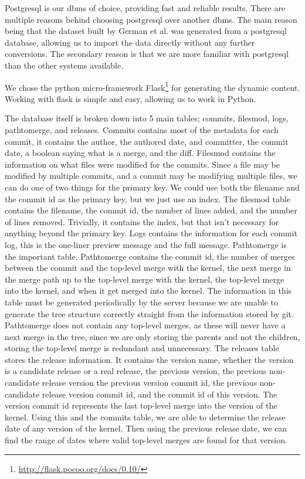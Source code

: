 \documentclass[conference, draftclsnofoot]{IEEEtran}
\begin{document}
Postgresql is our dbms of choice, providing fast and reliable results. There
are multiple reasons behind choosing postgresql over another dbms. The main
reason being that the dataset built by German et al. was generated from
a postgresql database, allowing us to import the data directly without any
further conversions. The secondary reason is that we are more familiar with
postgresql than the other systems available.

We chose the python micro-framework
Flask\footnote{\url{http://flask.pocoo.org/docs/0.10/}} for generating the
dynamic content.  Working with flask is simple and easy, allowing us to work in
Python.

The database itself is broken down into 5 main tables; commits, filesmod, logs,
pathtomerge, and releases. Commits contains most of the metadata for each
commit, it contains the author, the authored date, and committer, the commit
date, a boolean saying what is a merge, and the diff. Filesmod contains the
information on what files were modified for the commits. Since a file may be
modified by multiple commits, and a commit may be modifying multiple files, we
can do one of two things for the primary key. We could use both the filename
and the commit id as the primary key, but we just use an index. The filesmod
table contains the filename, the commit id, the number of lines added, and the
number of lines removed. Trivially, it contains the index, but that isn't
necessary for anything beyond the primary key. Logs contains the information
for each commit log, this is the one-liner preview message and the full
message. Pathtomerge is the important table. Pathtomerge contains the commit
id, the number of merges between the commit and the top-level merge with the
kernel, the next merge in the merge path up to the top-level merge with the
kernel, the top-level merge into the kernel, and when it get merged into the
kernel. The information in this table must be generated periodically by the
server because we are unable to generate the tree structure correctly straight
from the information stored by git. Pathtomerge does not contain any top-level
merges, as these will never have a next merge in the tree, since we are only
storing the parents and not the children, storing the top-level merge is
redundant and unnecessary. The releases table stores the release information.
It contains the version name, whether the version is a candidate release or a
real release, the previous version, the previous non-candidate release version
the previous version commit id, the previous non-candidate release version
commit id, and the commit id of this version. The version commit id represents
the last top-level merge into the version of the kernel. Using this and the
commits table, we are able to determine the release date of any version of the
kernel. Then using the previous release date, we can find the range of dates
where valid top-level merges are found for that version.
\end{document}
